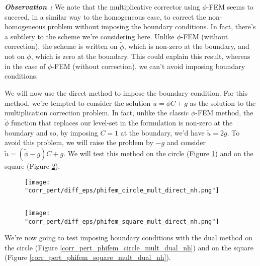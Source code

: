 \begin{enumerate}[label=\textbullet]
	\textbf{\textit{Observation :}} We note that the multiplicative corrector using $\phi$-FEM seems to succeed, in a similar way to the homogeneous case, to correct the non-homogeneous problem without imposing the boundary conditions. In fact, there's a subtlety to the scheme we're considering here. Unlike $\phi$-FEM (without correction), the scheme is written on $\tilde{\phi}$, which is non-zero at the boundary, and not on $\phi$, which is zero at the boundary. This could explain this result, whereas in the case of $\phi$-FEM (without correction), we can't avoid imposing boundary conditions.
	
	We will now use the direct method to impose the boundary condition. For this method, we're tempted to consider the solution $\tilde{u}=\tilde{\phi}C+g$ as the solution to the multiplication correction problem. In fact, unlike the classic $\phi$-FEM method, the $\tilde{\phi}$ function that replaces our level-set in the formulation is non-zero at the boundary and so, by imposing $C=1$ at the boundary, we'd have $\tilde{u}=2g$. To avoid this problem, we will raise the problem by $-g$ and consider $\tilde{u}=(\tilde{\phi}-g)C+g$. We will test this method on the circle (Figure \ref{corr_pert_phifem_circle_mult_direct_nh}) and on the square (Figure \ref{corr_pert_phifem_square_mult_direct_nh}).
	
	\begin{minipage}{0.48\linewidth}
		\begin{figure}[H]
			\centering
			\texttt{[image: "corr\_pert/diff\_eps/phifem\_circle\_mult\_direct\_nh.png"]}
			\label{corr_pert_phifem_circle_mult_direct_nh}
		\end{figure} 
	\end{minipage} $\qquad$
	\begin{minipage}{0.48\linewidth}
		\begin{figure}[H]
			\centering
			\texttt{[image: "corr\_pert/diff\_eps/phifem\_square\_mult\_direct\_nh.png"]}
			\label{corr_pert_phifem_square_mult_direct_nh}
		\end{figure} 
	\end{minipage}
	
	We're now going to test imposing boundary conditions with the dual method on the circle (Figure \ref{corr_pert_phifem_circle_mult_dual_nh}) and on the square (Figure \ref{corr_pert_phifem_square_mult_dual_nh}).
	

\end{enumerate}
